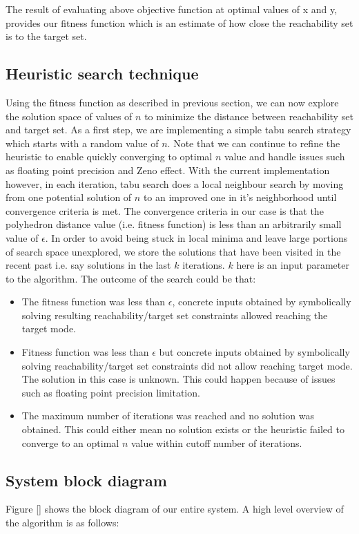 The result of evaluating above objective function at optimal values of x and y, provides our fitness function which is an estimate of how close the reachability set is to the target set.

\subsection{Heuristic search technique}
Using the fitness function as described in previous section, we can now explore the solution space of values of $\textit{n}$ to minimize the distance between reachability set and target set. As a first step, we are implementing a simple tabu search strategy which starts with a random value of $\textit{n}$. Note that we can continue to refine the heuristic to enable quickly converging to optimal $\textit{n}$ value and handle issues such as floating point precision and Zeno effect. With the current implementation however, in each iteration, tabu search does a local neighbour search by moving from one potential solution of $\textit{n}$ to an improved one in it's neighborhood until convergence criteria is met. The convergence criteria in our case is that the polyhedron distance value (i.e. fitness function) is less than an arbitrarily small value of $\epsilon$. In order to avoid being stuck in local minima and leave large portions of search space unexplored, we store the solutions that have been visited in the recent past i.e. say solutions in the last $\textit{k}$ iterations. $\textit{k}$ here is an input parameter to the algorithm. The outcome of the search could be that: 
\begin{itemize}
\item The fitness function was less than $\epsilon$, concrete inputs obtained by symbolically solving resulting reachability/target set constraints allowed reaching the target mode.
\item Fitness function was less than $\epsilon$ but concrete inputs obtained by symbolically solving reachability/target set constraints did not allow reaching target mode. The solution in this case is unknown. This could happen because of issues such as floating point precision limitation.  
\item The maximum number of iterations was reached and no solution was obtained. This could either mean no solution exists or the heuristic failed to converge to an optimal $\textit{n}$ value within cutoff number of iterations.  
\end{itemize} 

\subsection{System block diagram}
Figure [] shows the block diagram of our entire system. A high level overview of the algorithm is as follows:


